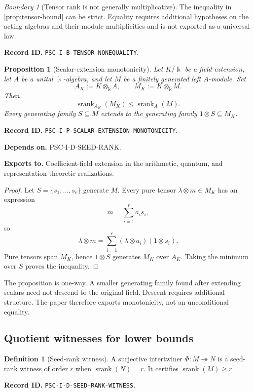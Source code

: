 \documentclass[11pt]{article}
\newtheorem{proposition}[proposition]{Proposition}
\theoremstyle{definition}
\newtheorem{definition}[definition]{Definition}
\theoremstyle{remark}
\newtheorem{boundary}[boundary]{Boundary}
\newcommand{\bbk}{\Bbbk}
\newcommand{\srank}{\operatorname{srank}}
\newcommand{\RecordID}[1]{\par\smallskip\noindent\begingroup\footnotesize\color{PSCGray}\raggedright\textbf{Record ID.} \nolinkurl{#1}.\par\endgroup}
\newcommand{\Depends}[1]{\par\noindent\begingroup\footnotesize\color{PSCGray}\raggedright\textbf{Depends on.} #1\par\endgroup}
\newcommand{\Exports}[1]{\par\noindent\begingroup\footnotesize\color{PSCGray}\raggedright\textbf{Exports to.} #1\par\endgroup}
\begin{document}
\begin{boundary}[Tensor rank is not generally multiplicative]
\label{bnd:tensor-nonequality}
The inequality in \cref{prop:tensor-bound} can be strict.  Equality requires additional hypotheses on the acting algebras and their module multiplicities and is not exported as a universal law.
\end{boundary}
\RecordID{PSC-I-B-TENSOR-NONEQUALITY}



\begin{proposition}[Scalar-extension monotonicity]
\label{prop:scalar-extension}
Let \(K/\bbk\) be a field extension, let \(A\) be a unital \(\bbk\)-algebra, and let \(M\) be a finitely generated left \(A\)-module.  Set
\[
A_K:=K\otimes_{\bbk}A,
\qquad
M_K:=K\otimes_{\bbk}M.
\]
Then
\[
\boxed{
\srank_{A_K}(M_K)\leq\srank_A(M).
}
\]
Every generating family \(S\subseteq M\) extends to the generating family \(1\otimes S\subseteq M_K\).
\end{proposition}
\RecordID{PSC-I-P-SCALAR-EXTENSION-MONOTONICITY}
\Depends{PSC-I-D-SEED-RANK.}
\Exports{Coefficient-field extension in the arithmetic, quantum, and representation-theoretic realizations.}

\begin{proof}
Let \(S=\{s_1,\ldots,s_r\}\) generate \(M\).  Every pure tensor \(\lambda\otimes m\in M_K\) has an expression
\[
m=\sum_{i=1}^r a_is_i,
\]
so
\[
\lambda\otimes m
=
\sum_{i=1}^r(\lambda\otimes a_i)(1\otimes s_i).
\]
Pure tensors span \(M_K\), hence \(1\otimes S\) generates \(M_K\) over \(A_K\).  Taking the minimum over \(S\) proves the inequality.
\end{proof}

\begin{hypothesisguide}
The proposition is one-way.  A smaller generating family found after extending scalars need not descend to the original field.  Descent requires additional structure.  The paper therefore exports monotonicity, not an unconditional equality.
\end{hypothesisguide}


\subsection{Quotient witnesses for lower bounds}
\begin{definition}[Seed-rank witness]
\label{def:seed-rank-witness}
A surjective intertwiner $\Phi:M\twoheadrightarrow N$ is a seed-rank witness of order $r$ when $\srank(N)=r$.  It certifies $\srank(M)\geq r$.
\end{definition}
\RecordID{PSC-I-D-SEED-RANK-WITNESS}
\end{document}
